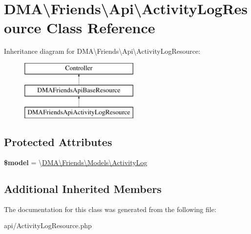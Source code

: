 \hypertarget{classDMA_1_1Friends_1_1Api_1_1ActivityLogResource}{}\section{D\+M\+A\textbackslash{}Friends\textbackslash{}Api\textbackslash{}Activity\+Log\+Resource Class Reference}
\label{classDMA_1_1Friends_1_1Api_1_1ActivityLogResource}
Inheritance diagram for D\+M\+A\textbackslash{}Friends\textbackslash{}Api\textbackslash{}Activity\+Log\+Resource\+:\begin{figure}[H]
\begin{center}
\leavevmode
\includegraphics[height=3.000000cm]{d2/de6/classDMA_1_1Friends_1_1Api_1_1ActivityLogResource}
\end{center}
\end{figure}
\subsection*{Protected Attributes}
\begin{DoxyCompactItemize}
\item 
\hypertarget{classDMA_1_1Friends_1_1Api_1_1ActivityLogResource_abc7fd905609e3135075185ce7af02e43}{}{\bfseries \$model} = \textquotesingle{}\textbackslash{}\hyperlink{classDMA_1_1Friends_1_1Models_1_1ActivityLog}{D\+M\+A\textbackslash{}\+Friends\textbackslash{}\+Models\textbackslash{}\+Activity\+Log}\textquotesingle{}\label{classDMA_1_1Friends_1_1Api_1_1ActivityLogResource_abc7fd905609e3135075185ce7af02e43}

\end{DoxyCompactItemize}
\subsection*{Additional Inherited Members}


The documentation for this class was generated from the following file\+:\begin{DoxyCompactItemize}
\item 
api/Activity\+Log\+Resource.\+php\end{DoxyCompactItemize}
